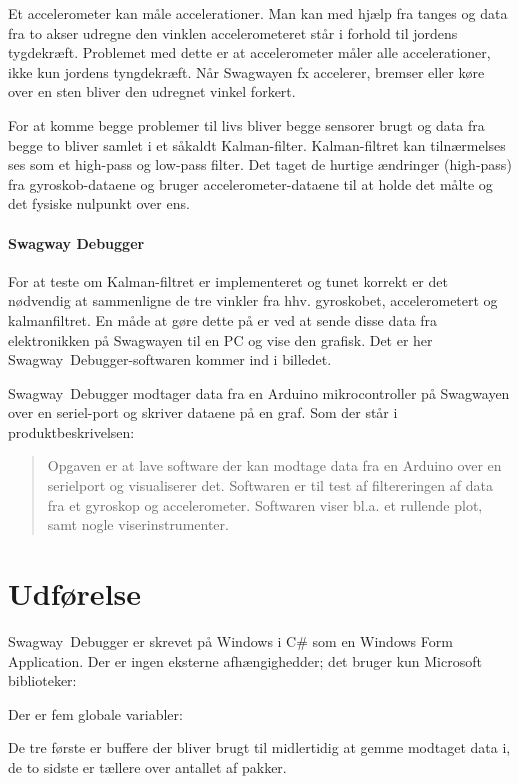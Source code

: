 \documentclass[a4paper,oneside,article,danish,table]{memoir}
\newcommand{\form}[2]{}
\begin{document}
Et accelerometer kan måle accelerationer. Man kan med hjælp fra tanges og data fra to akser udregne den vinklen accelerometeret står i forhold til jordens tygdekræft. Problemet med dette er at accelerometer måler alle accelerationer, ikke kun jordens tyngdekræft. Når Swagwayen fx accelerer, bremser eller køre over en sten bliver den udregnet vinkel forkert.

For at komme begge problemer til livs bliver begge sensorer brugt og data fra begge to bliver samlet i et såkaldt Kalman-filter. Kalman-filtret kan tilnærmelses ses som et high-pass og low-pass filter. Det taget de hurtige ændringer (high-pass) fra gyroskob-dataene og bruger accelerometer-dataene til at holde det målte og det fysiske nulpunkt over ens.

\subsubsection{Swagway Debugger}
For at teste om Kalman-filtret er implementeret og tunet korrekt er det nødvendig at sammenligne de tre vinkler fra hhv. gyroskobet, accelerometert og kalmanfiltret. En måde at gøre dette på er ved at sende disse data fra elektronikken på Swagwayen til en PC og vise den grafisk. Det er her Swagway~Debugger-softwaren kommer ind i billedet.

Swagway~Debugger modtager data fra en Arduino mikrocontroller på Swagwayen over en seriel-port og skriver dataene på en graf. Som der står i produktbeskrivelsen:
\begin{quotation}
  Opgaven er at lave software der kan modtage data fra en Arduino over en serielport og visualiserer det. Softwaren er til test af filtereringen af data fra et gyroskop og accelerometer. Softwaren viser bl.a. et rullende plot, samt nogle viserinstrumenter.
\end{quotation}

\chapter{Udførelse}
Swagway~Debugger er skrevet på Windows i C\# som en Windows Form Application. Der er ingen eksterne afhængighedder; det bruger kun Microsoft biblioteker: 
\form{9}{12}
Der er fem globale variabler:
\form{18}{23}
De tre første er buffere der bliver brugt til midlertidig at gemme modtaget data i, de to sidste er tællere over antallet af pakker.
\end{document}
